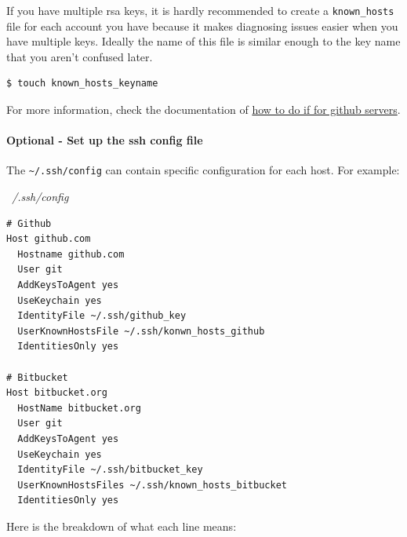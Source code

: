 \documentclass{article}
\newenvironment{blocktemplateII}[1]{%
    \tcolorbox[beamer,%
    noparskip,breakable,
    colframe=Green,%
    colbacklower=LimeGreen!75!LightGreen,%
    title=#1]}%
    {\endtcolorbox}
\newenvironment{codetemplate}[1][]{%
  \mybasecolorbox[#1]
  \itshape
}{%
  \endmybasecolorbox
}
\begin{document}
\begin{blocktemplateII}{Note}
If you have multiple rsa keys, it is hardly recommended to create a \verb+known_hosts+ file for each account you have because it makes diagnosing issues easier when you have multiple keys. Ideally the name of this file is similar enough to the key name that you aren't confused later.

\begin{codetemplate}{}
\begin{verbatim}
$ touch known_hosts_keyname
\end{verbatim}
\end{codetemplate}
\end{blocktemplateII}

For more information, check the documentation of \href{https://docs.github.com/en/authentication/connecting-to-github-with-ssh/generating-a-new-ssh-key-and-adding-it-to-the-ssh-agent}{how to do if for github servers}.

\paragraph{Optional - Set up the ssh config file}

The \verb+~/.ssh/config+ can contain specific configuration for each host. For example:

\begin{codetemplate}{~/.ssh/config}
\begin{verbatim}
# Github
Host github.com
  Hostname github.com
  User git
  AddKeysToAgent yes
  UseKeychain yes
  IdentityFile ~/.ssh/github_key
  UserKnownHostsFile ~/.ssh/konwn_hosts_github
  IdentitiesOnly yes

# Bitbucket
Host bitbucket.org
  HostName bitbucket.org
  User git
  AddKeysToAgent yes
  UseKeychain yes
  IdentityFile ~/.ssh/bitbucket_key
  UserKnownHostsFiles ~/.ssh/known_hosts_bitbucket
  IdentitiesOnly yes
\end{verbatim}
\end{codetemplate}

Here is the breakdown of what each line means:
\end{document}
